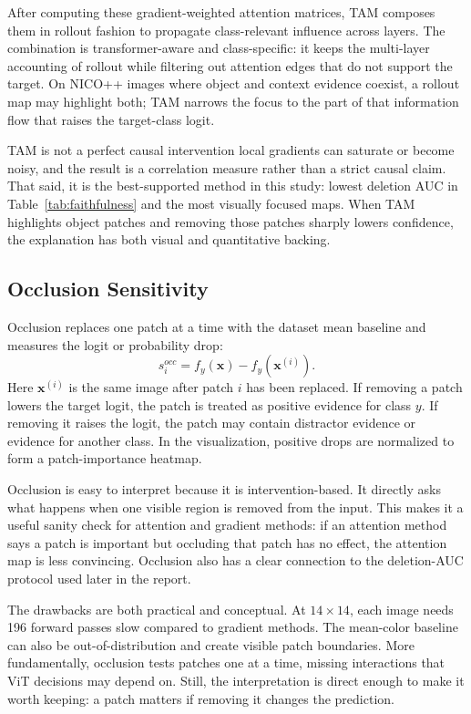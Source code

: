 \documentclass[10pt]{article}
\begin{document}
After computing these gradient-weighted attention matrices, TAM composes them in rollout fashion to propagate class-relevant influence across layers. The combination is transformer-aware and class-specific: it keeps the multi-layer accounting of rollout while filtering out attention edges that do not support the target. On NICO++ images where object and context evidence coexist, a rollout map may highlight both; TAM narrows the focus to the part of that information flow that raises the target-class logit.

TAM is not a perfect causal intervention local gradients can saturate or become noisy, and the result is a correlation measure rather than a strict causal claim. That said, it is the best-supported method in this study: lowest deletion AUC in Table~\ref{tab:faithfulness} and the most visually focused maps. When TAM highlights object patches and removing those patches sharply lowers confidence, the explanation has both visual and quantitative backing.

\subsection{Occlusion Sensitivity}
Occlusion replaces one patch at a time with the dataset mean baseline and measures the logit or probability drop:
\[
s_i^{occ}=f_y(\mathbf{x})-f_y(\mathbf{x}^{(i)}).
\]
Here $\mathbf{x}^{(i)}$ is the same image after patch $i$ has been replaced. If removing a patch lowers the target logit, the patch is treated as positive evidence for class $y$. If removing it raises the logit, the patch may contain distractor evidence or evidence for another class. In the visualization, positive drops are normalized to form a patch-importance heatmap.

Occlusion is easy to interpret because it is intervention-based. It directly asks what happens when one visible region is removed from the input. This makes it a useful sanity check for attention and gradient methods: if an attention method says a patch is important but occluding that patch has no effect, the attention map is less convincing. Occlusion also has a clear connection to the deletion-AUC protocol used later in the report.

The drawbacks are both practical and conceptual. At $14\times14$, each image needs 196 forward passes slow compared to gradient methods. The mean-color baseline can also be out-of-distribution and create visible patch boundaries. More fundamentally, occlusion tests patches one at a time, missing interactions that ViT decisions may depend on. Still, the interpretation is direct enough to make it worth keeping: a patch matters if removing it changes the prediction.
\end{document}
